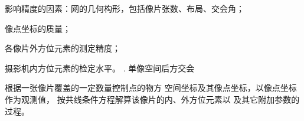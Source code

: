 \documentclass[a4paper]{ctexart}
\begin{document}
影响精度的因素：网的几何构形，包括像片张数、布局、交会角；

像点坐标的质量；

各像片外方位元素的测定精度；

摄影机内方位元素的检定水平。
. 单像空间后方交会

根据一张像片覆盖的一定数量控制点的物方 空间坐标及其像点坐标，以像点坐标作为观测值， 按共线条件方程解算该像片的内、外方位元素以 及其它附加参数的过程。

\begin{figure}[htbp]
\centering

%
%


\end{figure}
\end{document}
